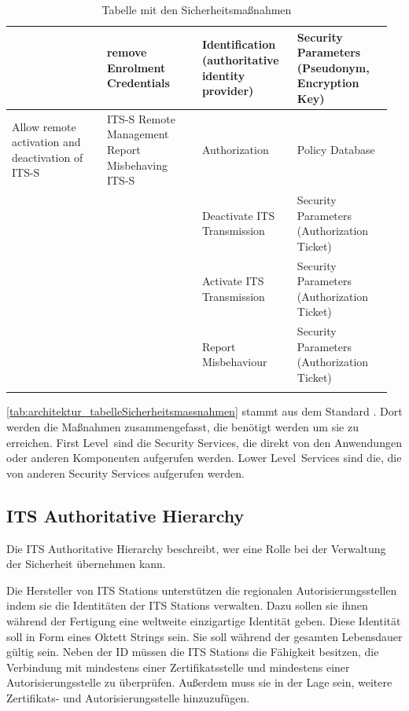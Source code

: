 \begin{longtable}{| p{0.24\linewidth} | p{0.24\linewidth} | p{0.24\linewidth} |p{0.24\linewidth}|}
\cline{2-4}
& remove Enrolment Credentials & Identification (authoritative identity provider) & Security Parameters (Pseudonym, Encryption Key)\\
\hline
Allow remote activation and deactivation of ITS-S & ITS-S Remote Management Report Misbehaving ITS-S & Authorization & Policy Database \\
\cline{3-4}
 & & Deactivate ITS Transmission & Security Parameters (Authorization Ticket) \\
 \cline{3-4}
& &  Activate ITS Transmission & Security Parameters (Authorization Ticket) \\
\cline{3-4}
& & Report Misbehaviour & Security Parameters (Authorization Ticket) \\
\hline 
\caption{Tabelle mit den Sicherheitsmaßnahmen \cite{ts102731}}
\label{tab:architektur_tabelleSicherheitsmassnahmen}
 
 \end{longtable}
\autoref{tab:architektur_tabelleSicherheitsmassnahmen} stammt aus dem Standard \cite{ts102731}. Dort werden die Maßnahmen zusammengefasst, die benötigt werden um sie zu erreichen. \glqq First Level\grqq~sind die Security Services, die direkt von den Anwendungen oder anderen Komponenten aufgerufen werden.  \glqq Lower Level\grqq~Services sind die, die von anderen Security Services aufgerufen werden.

\subsection{ITS Authoritative Hierarchy}
Die ITS Authoritative Hierarchy beschreibt, wer eine Rolle bei der Verwaltung der Sicherheit übernehmen kann. 

Die Hersteller von \ac{ITS} Stations unterstützen die regionalen Autorisierungsstellen indem sie die Identitäten der \ac{ITS} Stations verwalten. Dazu sollen sie ihnen während der Fertigung eine weltweite einzigartige Identität geben. Diese Identität soll  in Form eines Oktett Strings sein. Sie soll während der gesamten Lebensdauer gültig sein.
Neben der \ac{ID} müssen die \ac{ITS} Stations die Fähigkeit besitzen, die Verbindung mit mindestens einer Zertifikatsstelle und mindestens einer Autorisierungsstelle zu überprüfen.  Außerdem muss sie in der Lage sein, weitere Zertifikats- und Autorisierungsstelle hinzuzufügen.

